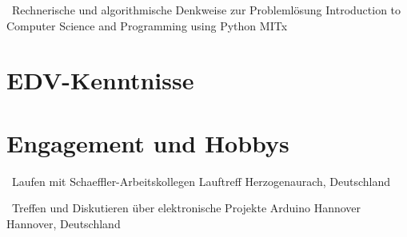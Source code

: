\documentclass[11pt,a4paper,sans]{moderncv}
\begin{document}
{\ Rechnerische und algorithmische Denkweise zur Problemlösung}
{Introduction to Computer Science and Programming using Python}
{MITx}
{}
{}



\section{\textbf{EDV-Kenntnisse}}






\section{\textbf{Engagement und Hobbys}}

{\ Laufen mit Schaeffler-Arbeitskollegen}
{Lauftreff}
{Herzogenaurach, Deutschland}
{}
{}

{\ Treffen und Diskutieren über elektronische Projekte}
{Arduino Hannover}
{Hannover, Deutschland}
{}
{}
\end{document}
